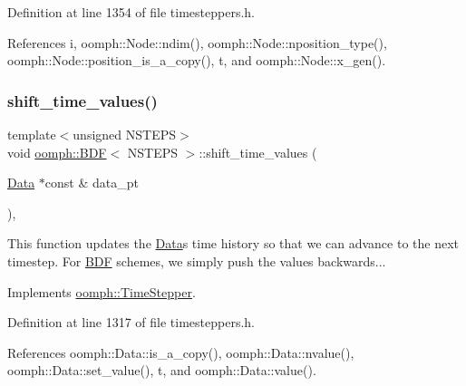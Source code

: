 Definition at line 1354 of file timesteppers.\+h.



References i, oomph\+::\+Node\+::ndim(), oomph\+::\+Node\+::nposition\+\_\+type(), oomph\+::\+Node\+::position\+\_\+is\+\_\+a\+\_\+copy(), t, and oomph\+::\+Node\+::x\+\_\+gen().

\mbox{\label{classoomph_1_1BDF_a037ce83f202e4ba2e61666bfdb1ce4b9}} 
\subsubsection{\texorpdfstring{shift\+\_\+time\+\_\+values()}{shift\_time\_values()}}
{\footnotesize\ttfamily template$<$unsigned N\+S\+T\+E\+PS$>$ \\
void \hyperlink{classoomph_1_1BDF}{oomph\+::\+B\+DF}$<$ N\+S\+T\+E\+PS $>$\+::shift\+\_\+time\+\_\+values (\begin{DoxyParamCaption}\item[{\hyperlink{classoomph_1_1Data}{Data} $\ast$const \&}]{data\+\_\+pt }\end{DoxyParamCaption})\hspace{0.3cm}{\ttfamily [inline]}, {\ttfamily [virtual]}}



This function updates the \hyperlink{classoomph_1_1Data}{Data}\textquotesingle{}s time history so that we can advance to the next timestep. For \hyperlink{classoomph_1_1BDF}{B\+DF} schemes, we simply push the values backwards... 



Implements \hyperlink{classoomph_1_1TimeStepper_a010a3b03a23a1c48dd8ca10641427255}{oomph\+::\+Time\+Stepper}.



Definition at line 1317 of file timesteppers.\+h.



References oomph\+::\+Data\+::is\+\_\+a\+\_\+copy(), oomph\+::\+Data\+::nvalue(), oomph\+::\+Data\+::set\+\_\+value(), t, and oomph\+::\+Data\+::value().

\mbox{\label{classoomph_1_1BDF_a77259e610f40a996c4e8d6151078ce94}} 

